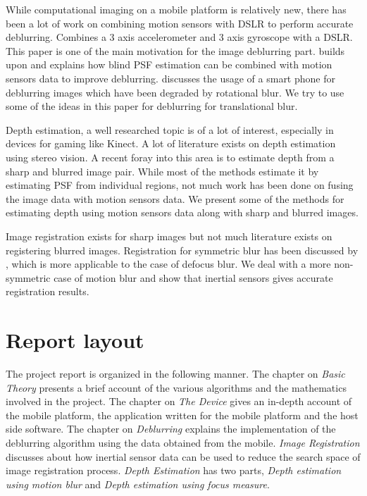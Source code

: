 \documentclass[BTech]{iitmdiss}
\begin{document}
While computational imaging on a mobile platform is relatively new, there
has been a lot of work on combining motion sensors with DSLR to perform
accurate deblurring. \citet{joshi2010image} Combines a 3 axis accelerometer
and 3 axis gyroscope with a DSLR. This paper is one of the main motivation
for the image deblurring part. \citet{bae2013accurate} builds upon
\citet{joshi2010image} and explains how blind PSF estimation can be
combined with motion sensors data to improve deblurring. \citet{vsindelavr2013image} discusses the usage of a smart phone for deblurring
images which have been degraded by rotational blur. We try to use some
of the ideas in this paper for deblurring for translational blur.

Depth estimation, a well researched topic is of a lot of interest, 
especially in devices for gaming like Kinect. A lot of literature exists
on depth estimation using stereo vision. A recent foray into this area
is to estimate depth from a sharp and blurred image pair. While most of 
the methods estimate it by estimating PSF from individual regions, not
much work has been done on fusing the image data with motion sensors 
data. We present some of the methods for estimating depth using motion
sensors data along with sharp and blurred images. 

Image registration exists for sharp images but not much literature exists
on registering blurred images. Registration for symmetric blur
has been discussed by \citet{ojansivu2007image}, which is more applicable
to the case of defocus blur. We deal with a more non-symmetric case of
motion blur and show that inertial sensors gives accurate registration 
results.

\section{Report layout}
\label{intro:layout}
The project report is organized in the following manner. The chapter on 
\emph{Basic Theory} presents a brief account of the various algorithms
and the mathematics involved in the project. The chapter on \emph{The Device} gives an
in-depth account of the mobile platform, the application written for the
mobile platform and the host side software. The chapter on \emph{Deblurring} 
explains the implementation of the deblurring algorithm using the data
obtained from the mobile. \emph{Image Registration} discusses about how
inertial sensor data can be used to reduce the search space of image 
registration process. \emph{Depth Estimation} has two parts, 
\emph{Depth estimation using motion blur} and \emph{Depth estimation 
using focus measure}.
\end{document}
